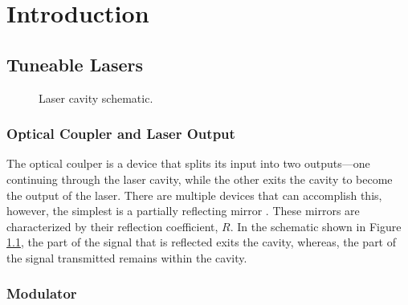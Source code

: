 
\chapter{Introduction}


\section{Tuneable Lasers}
\begin{figure}[htbp]
\centering

\caption[Laser Cavity]{Laser cavity schematic.}
\label{fig:cavity}
\end{figure}

\subsection{Optical Coupler and Laser Output}
The optical coulper is a device that splits its input into two outputs---one continuing through the laser cavity, while the other exits the cavity to become the output of the laser. There are multiple devices that can accomplish this, however, the simplest is a partially reflecting mirror \cite{alazzawi}. These mirrors are characterized by their reflection coefficient, $R$. In the schematic shown in Figure \ref{fig:cavity}, the part of the signal that is reflected exits the cavity, whereas, the part of the signal transmitted remains within the cavity. \\

\subsection{Modulator}

